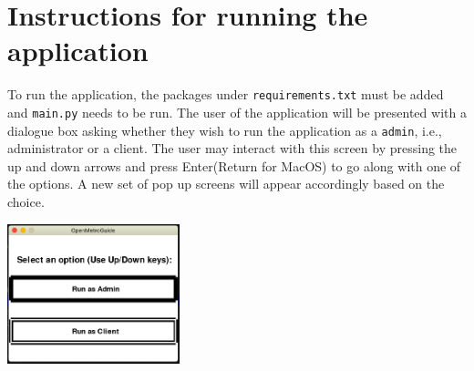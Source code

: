 \documentclass[fontsize=11pt]{article}
\begin{document}
    \section*{Instructions for running the application}
    To run the application, the packages under \texttt{requirements.txt} must be added and \texttt{main.py} needs to be run. The user of the application will be presented with a dialogue box asking whether they wish to run the application as a \texttt{admin}, i.e., administrator or a client. The user may interact with this screen by pressing the up and down arrows and press Enter(Return for MacOS) to go along with one of the options. A new set of pop up screens will appear accordingly based on the choice.\\
    \begin{center}
        \includegraphics[width = 5cm]{admin or client.png}\newline
    \end{center}
\end{document}
